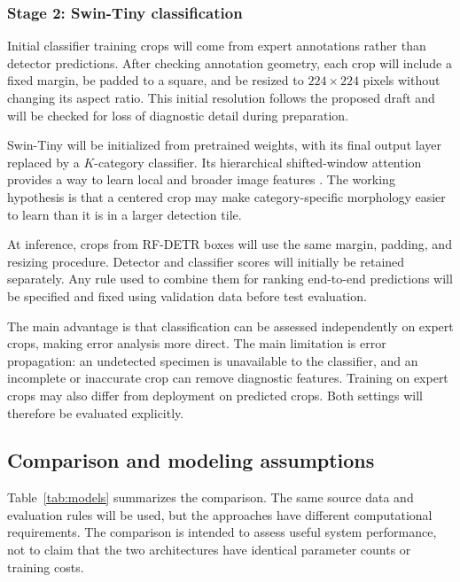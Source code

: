 \documentclass[conference,letterpaper]{IEEEtran}
\begin{document}
\subsubsection{Stage 2: Swin-Tiny classification}
Initial classifier training crops will come from expert annotations rather than detector predictions. After checking annotation geometry, each crop will include a fixed margin, be padded to a square, and be resized to $224\times224$ pixels without changing its aspect ratio. This initial resolution follows the proposed draft and will be checked for loss of diagnostic detail during preparation.

Swin-Tiny will be initialized from pretrained weights, with its final output layer replaced by a $K$-category classifier. Its hierarchical shifted-window attention provides a way to learn local and broader image features \cite{liu2021}. The working hypothesis is that a centered crop may make category-specific morphology easier to learn than it is in a larger detection tile.

At inference, crops from RF-DETR boxes will use the same margin, padding, and resizing procedure. Detector and classifier scores will initially be retained separately. Any rule used to combine them for ranking end-to-end predictions will be specified and fixed using validation data before test evaluation.

The main advantage is that classification can be assessed independently on expert crops, making error analysis more direct. The main limitation is error propagation: an undetected specimen is unavailable to the classifier, and an incomplete or inaccurate crop can remove diagnostic features. Training on expert crops may also differ from deployment on predicted crops. Both settings will therefore be evaluated explicitly.

\subsection{Comparison and modeling assumptions}
Table~\ref{tab:models} summarizes the comparison. The same source data and evaluation rules will be used, but the approaches have different computational requirements. The comparison is intended to assess useful system performance, not to claim that the two architectures have identical parameter counts or training costs.
\end{document}
